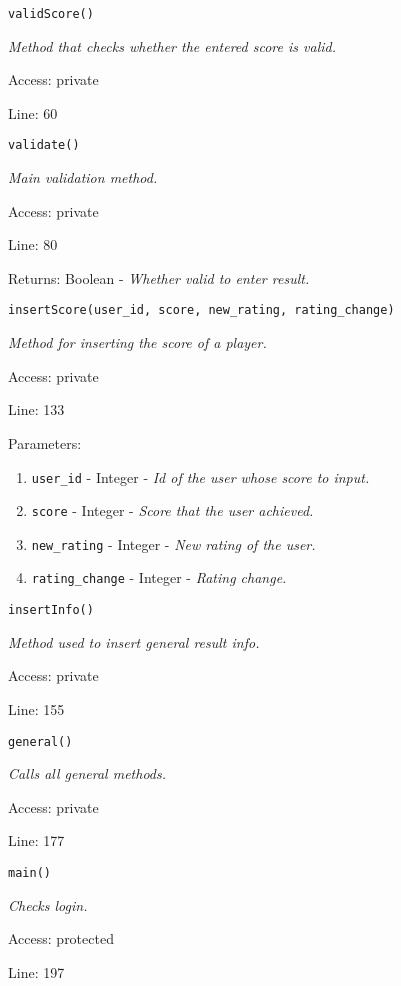 \texttt{validScore()}

{\scriptsize
\textit{Method that checks whether the entered score is valid.}

Access: private

Line: 60

}

\texttt{validate()}

{\scriptsize
\textit{Main validation method.}

Access: private

Line: 80

Returns: Boolean - \textit{Whether valid to enter result.}

}

\texttt{insertScore(user\_id, score, new\_rating, rating\_change)}

{\scriptsize
\textit{Method for inserting the score of a player.}

Access: private

Line: 133

Parameters:

\begin{enumerate}
\item \texttt{user\_id} - Integer - \textit{Id of the user whose score to input.}
\item \texttt{score} - Integer - \textit{Score that the user achieved.}
\item \texttt{new\_rating} - Integer - \textit{New rating of the user.}
\item \texttt{rating\_change} - Integer - \textit{Rating change.}
\end{enumerate}
}

\texttt{insertInfo()}

{\scriptsize
\textit{Method used to insert general result info.}

Access: private

Line: 155

}

\texttt{general()}

{\scriptsize
\textit{Calls all general methods.}

Access: private

Line: 177

}

\texttt{main()}

{\scriptsize
\textit{Checks login.}

Access: protected

Line: 197

}

